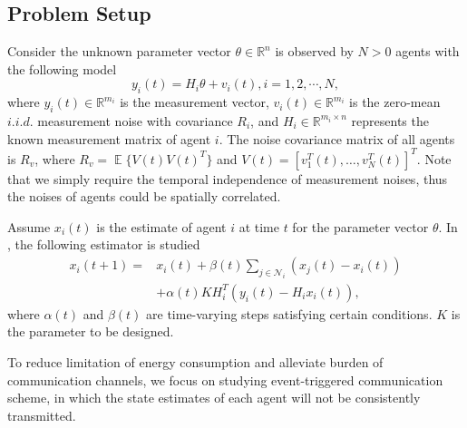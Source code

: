 \documentclass[10pt,journal,final]{IEEEtran}
\DeclareMathOperator{\Expect}{\mathbb{E}}
\theoremstyle{plain}
\theoremstyle{definition}
\theoremstyle{remark}
\begin{document}
\subsection{Problem Setup}
Consider the unknown parameter vector $\theta\in \mathbb{R}^n$ is observed by $N>0$ agents with the following model
\begin{equation}\label{system_all}
y_{i}(t)= H_{i}\theta+v_{i}(t),i=1,2,\cdots,N,
\end{equation}
where 
 $y_{i}(t)\in \mathbb{R}^{m_{i}}$ is the measurement vector, $v_{i}(t)\in \mathbb{R}^{m_{i}}$  is the zero-mean $i.i.d.$ measurement noise with covariance $R_{i}$, and $H_{i}\in \mathbb{R}^{m_{i}\times n}$  represents the known   measurement matrix of agent $i$. The noise covariance matrix of all agents is $R_v$, where $R_v=\Expect\{V(t)V(t)^T\}$ and $V(t)=\left[v_1^T(t),\dots,v_N^T(t)\right]^T$. Note that we simply require the temporal independence of measurement noises, thus the noises of agents could be spatially correlated.

Assume $x_{i}(t)$ is the  estimate of agent $i$ at time $t$ for the parameter vector $\theta$.
In \cite{kar2011convergence}, the  following estimator is studied
\begin{align}\label{eq_estimator0}
x_{i}(t+1)=&x_{i}(t)+\beta(t)\sum_{j\in\mathcal{N}_{i}}(x_{j}(t)-x_{i}(t))\\
&+\alpha(t) KH_{i}^T( y_{i}(t)-H_{i}x_{i}(t)),\nonumber
\end{align}
where $\alpha(t)$ and $\beta(t)$ are time-varying steps satisfying certain conditions. $K$ is the parameter to be designed.


To reduce   limitation of energy consumption and alleviate burden of communication channels, we focus on studying event-triggered communication scheme, in which the state estimates of each agent will not be consistently transmitted.  
\end{document}
